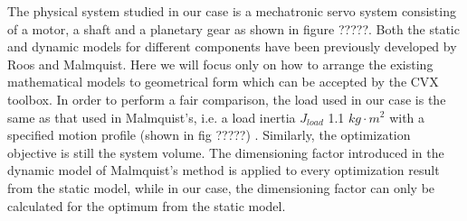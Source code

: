 The physical system studied in our case is a mechatronic servo system consisting of a motor, a shaft and a planetary gear as shown in figure ?????. Both the static and dynamic models for different components have been previously developed by Roos and Malmquist. Here we will focus only on how to arrange the existing mathematical models to geometrical form which can be accepted by the CVX toolbox. In order to perform a fair comparison, the load used in our case is the same as that used in Malmquist$’$s, i.e. a load inertia $J_{load}$ 1.1 $kg \cdot m^2$ with a specified motion profile (shown in fig ?????) . Similarly, the optimization objective is still the system volume. The dimensioning factor introduced in the dynamic model of Malmquist$’$s method is applied to every optimization result from the static model, while in our case, the dimensioning factor can only be calculated for the optimum from the static model.


